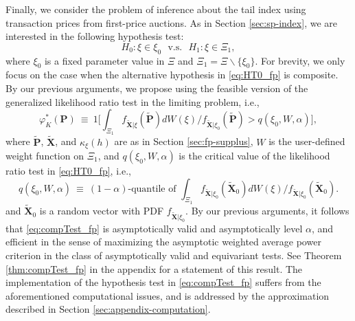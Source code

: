 Finally, we consider the problem of inference about the tail index using transaction prices from first-price auctions. As in Section \ref{sec:sp-index}, we are interested in the following hypothesis test:
\begin{equation}
H_{0}:\xi \in \xi _{0}~~~\text{v.s.}~~~H_{1}:\xi \in \Xi _{1},
\label{eq:HT0_fp}
\end{equation}
where $\xi _{0}$ is a fixed parameter value in $\Xi $ and $\Xi _{1}=\Xi \backslash \{ \xi _{0}\}$. For brevity, we only focus on the case when the alternative hypothesis in \eqref{eq:HT0_fp} is composite. By our previous arguments, we propose using the feasible version of the generalized likelihood ratio test in the limiting problem, i.e.,
\begin{equation}
\varphi _{K}^{\ast }( \mathbf{P}) ~\equiv ~1\bigg[ {\int_{\Xi _{1}}f_{\mathbf{\tilde{X}}|\xi }( \mathbf{\tilde{P}}) dW( \xi ) }/{f_{\mathbf{\tilde{X}}|\xi _{0}}( \mathbf{\tilde{P}}) }>q( \xi _{0},W,\alpha ) \bigg] ,  \label{eq:compTest_fp}
\end{equation}
where $\mathbf{\tilde{P}}$, $\mathbf{\tilde{X}}$, and $\kappa _{\xi }(h)$ are as in Section \ref{sec:fp-supplus},
$W$ is the user-defined weight function on $\Xi _{1}$, and $q( \xi _{0},W,\alpha ) $ is the critical value of the likelihood ratio test in \eqref{eq:HT0_fp}, i.e.,
\begin{equation*}
q( \xi _{0},W,\alpha ) ~\equiv ~( 1-\alpha ) \text{-quantile of }{\int_{\Xi _{1}}f_{\mathbf{\tilde{X}}|\xi _{0}}(  \mathbf{\tilde{X}}_{0}) dW( \xi ) }/{f_{\mathbf{\tilde{X}}|\xi _{0}}( \mathbf{\tilde{X}}_{0}) }.
\end{equation*}
and $\mathbf{\tilde{X}}_{0}$ is a random vector with PDF $f_{\mathbf{\tilde{X}}|\xi _{0}}$. By our previous arguments, it follows that \eqref{eq:compTest_fp} is asymptotically valid and asymptotically level $\alpha $, and efficient in the sense of maximizing the asymptotic weighted average power criterion in the class of asymptotically valid and equivariant tests. See Theorem \ref{thm:compTest_fp} in the appendix for a statement of this result. The implementation of the hypothesis test in \eqref{eq:compTest_fp} suffers from the aforementioned computational issues, and is addressed by the approximation described in Section \ref{sec:appendix-computation}. 

